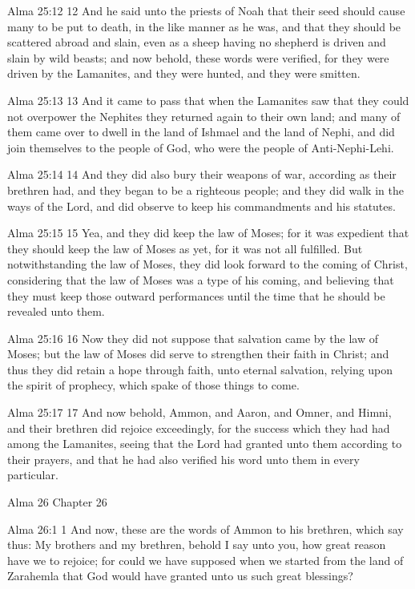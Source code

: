 Alma 25:12
 12 And he said unto the priests of Noah that their seed should
cause many to be put to death, in the like manner as he was, and
that they should be scattered abroad and slain, even as a sheep
having no shepherd is driven and slain by wild beasts; and now
behold, these words were verified, for they were driven by the
Lamanites, and they were hunted, and they were smitten.

Alma 25:13
 13 And it came to pass that when the Lamanites saw that they
could not overpower the Nephites they returned again to their own
land; and many of them came over to dwell in the land of Ishmael
and the land of Nephi, and did join themselves to the people of
God, who were the people of Anti-Nephi-Lehi.

Alma 25:14
 14 And they did also bury their weapons of war, according as
their brethren had, and they began to be a righteous people; and
they did walk in the ways of the Lord, and did observe to keep
his commandments and his statutes.

Alma 25:15
 15 Yea, and they did keep the law of Moses; for it was expedient
that they should keep the law of Moses as yet, for it was not all
fulfilled. But notwithstanding the law of Moses, they did look
forward to the coming of Christ, considering that the law of
Moses was a type of his coming, and believing that they must keep
those outward performances until the time that he should be
revealed unto them.

Alma 25:16
 16 Now they did not suppose that salvation came by the law of
Moses; but the law of Moses did serve to strengthen their faith
in Christ; and thus they did retain a hope through faith, unto
eternal salvation, relying upon the spirit of prophecy, which
spake of those things to come.

Alma 25:17
 17 And now behold, Ammon, and Aaron, and Omner, and Himni, and
their brethren did rejoice exceedingly, for the success which
they had had among the Lamanites, seeing that the Lord had
granted unto them according to their prayers, and that he had
also verified his word unto them in every particular.

Alma 26
Chapter 26

Alma 26:1
 1 And now, these are the words of Ammon to his brethren, which
say thus: My brothers and my brethren, behold I say unto you, how
great reason have we to rejoice; for could we have supposed when
we started from the land of Zarahemla that God would have granted
unto us such great blessings?

